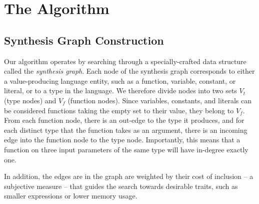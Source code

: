 \section{The Algorithm}
\label{sec:algorithm}
\subsection{Synthesis Graph Construction}
\label{sec:algorithm:graph}

Our algorithm operates by searching through a specially-crafted data
structure called the {\emph{synthesis graph}}. Each node of the synthesis graph
corresponds to either a value-producing language entity, such as a
function, variable, constant, or literal, or to a type in the
language. We therefore divide nodes into two sets $V_t$ (type nodes) and $V_f$ (function nodes). 
Since variables, constants, and literals can be considered
functions taking the empty set to their value, they belong to $V_f$. From each function node, there is 
an out-edge to the type it produces, and for each distinct type that the
function takes as an argument, there is an incoming edge into the
function node to the type node. Importantly, this means that a
function on three input parameters of the same type will have
in-degree exactly one.

In addition, the edges are in the graph are
weighted by their cost of inclusion -- a subjective measure -- that
guides the search towards desirable traits, such as smaller
expressions or lower memory usage.
 


\iffalse
Each node is labeled by the full function signature so that
well-typed expressions can be synthesized. The edges in the graph are
weighted by their cost of inclusion -- a subjective measure -- that
guides the search towards desirable traits, such as smaller
expressions or lower memory usage.


The algorithm uses two procedures, along with some supporting
subroutines, to accomplish expression repairs by referring to this
graph. The repair algorithm itself degenerates into simple expression
synthesis when presented with an empty broken expression, and as such
subsumes the functionality described in
\cite{GveroETAL13CompleteCompletionTypesWeights}. Furthermore, the
algorithm can be seen as a generalization of the Prospector algorithm
described in \cite{MandelinetALL2005Jungloid}, since their
construction can be embedded within ours if only unary operations and
types are added to the graph.
\fi

